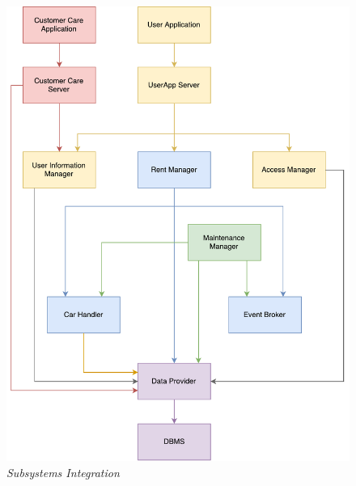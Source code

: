 	\begin{figure}[h]
			\centering
			\includegraphics[width=0.9\linewidth]{img/subsystemIntegration}
			\caption{
				\label{fig:subsystemIntegration} 
				\emph{Subsystems Integration}
			}
		\end{figure}
